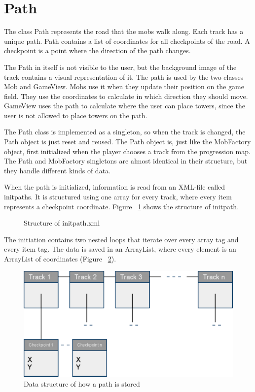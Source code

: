 \section{Path}

The class Path represents the road that the mobs walk along. Each track has a unique path. Path contains a list of coordinates for all checkpoints of the road. A checkpoint is a point where the direction of the path changes. 

The Path in itself is not visible to the user, but the background image of the track contains a visual representation of it. The path is used by the two classes Mob and GameView. Mobs use it when they update their position on the game field. They use the coordinates to calculate in which direction they should move. GameView uses the path to calculate where the user can place towers, since the user is not allowed to place towers on the path.

The Path class is implemented as a singleton, so when the track is changed, the Path object is just reset and reused. The Path object is, just like the MobFactory object, first initialized when the player chooses a track from the progression map. The Path and MobFactory singletons are almost identical in their structure, but they handle different kinds of data.

\clearpage

When the path is initialized, information is read from an XML-file called initpaths. It is structured using one array for every track, where every item represents a checkpoint coordinate. Figure ~\ref{fig:codeExInitPathXML} shows the structure of initpath.

\begin{figure}[htb]

\begin{small}

\end{small}

\caption{Structure of initpath.xml}
\label{fig:codeExInitPathXML}

\end{figure}

The initiation contains two nested loops that iterate over every array tag and every item tag. The data is saved in an ArrayList, where every element is an ArrayList of coordinates (Figure  ~\ref{fig:dataStructurePath}).

\begin{figure}[here]

\begin{center}
\includegraphics[scale=0.5]{pics/chapters/chapter4/pathlist2}
\end{center}

\caption{Data structure of how a path is stored}
\label{fig:dataStructurePath}
\end{figure}

